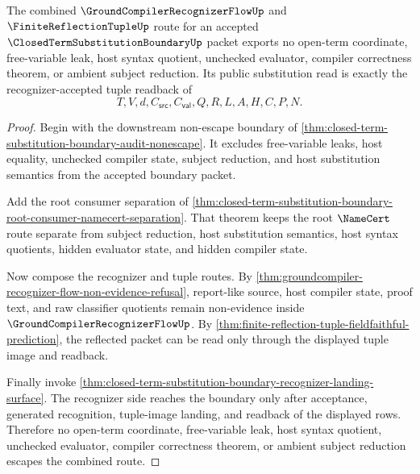 \begin{theorem}
\label{thm:closed-term-substitution-boundary-substitution-recognizer-nonescape}
The combined $\GroundCompilerRecognizerFlowUp$ and $\FiniteReflectionTupleUp$ route for an accepted $\ClosedTermSubstitutionBoundaryUp$ packet exports no open-term coordinate, free-variable leak, host syntax quotient, unchecked evaluator, compiler correctness theorem, or ambient subject reduction. Its public substitution read is exactly the recognizer-accepted tuple readback of
$$
T,V,d,C_{\mathsf{src}},C_{\mathsf{val}},Q,R,L,A,H,C,P,N.
$$
\end{theorem}
\begin{proof}
Begin with the downstream non-escape boundary of \autoref{thm:closed-term-substitution-boundary-audit-nonescape}. It excludes free-variable leaks, host equality, unchecked compiler state, subject reduction, and host substitution semantics from the accepted boundary packet.

Add the root consumer separation of \autoref{thm:closed-term-substitution-boundary-root-consumer-namecert-separation}. That theorem keeps the root $\NameCert$ route separate from subject reduction, host substitution semantics, host syntax quotients, hidden evaluator state, and hidden compiler state.

Now compose the recognizer and tuple routes. By \autoref{thm:groundcompiler-recognizer-flow-non-evidence-refusal}, report-like source, host compiler state, proof text, and raw classifier quotients remain non-evidence inside $\GroundCompilerRecognizerFlowUp$. By \autoref{thm:finite-reflection-tuple-fieldfaithful-prediction}, the reflected packet can be read only through the displayed tuple image and readback.

Finally invoke \autoref{thm:closed-term-substitution-boundary-recognizer-landing-surface}. The recognizer side reaches the boundary only after acceptance, generated recognition, tuple-image landing, and readback of the displayed rows. Therefore no open-term coordinate, free-variable leak, host syntax quotient, unchecked evaluator, compiler correctness theorem, or ambient subject reduction escapes the combined route.
\end{proof}

